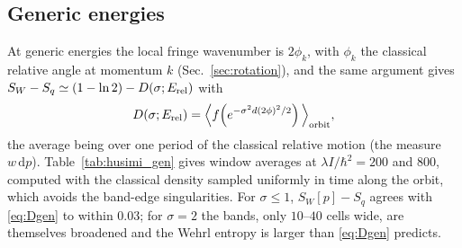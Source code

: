 \documentclass[preprint,12pt]{elsarticle}
\newcommand{\dd}{\mathrm{d}}
\newcommand{\Erel}{E_{\rm rel}}
\newcommand{\SW}{S_{W}}
\begin{document}
\subsection{Generic energies}

At generic energies the local fringe wavenumber is $2\phi_{k}$, with $\phi_{k}$
the classical relative angle at momentum $k$ (Sec.~\ref{sec:rotation}), and the
same argument gives $\SW-S_{q}\simeq(1-\ln2)-D(\sigma;\Erel)$ with
\begin{equation}
D(\sigma;\Erel)=\Big\langle f\!\left(e^{-\sigma^{2}d(2\phi)^{2}/2}\right)
\Big\rangle_{\rm orbit},
\label{eq:Dgen}
\end{equation}
the average being over one period of the classical relative motion (the
measure $w\,\dd p$). Table~\ref{tab:husimi_gen} gives window averages at
$\lambda I/\hbar^{2}=200$ and $800$, computed with the classical density sampled
uniformly in time along the orbit, which avoids the band-edge singularities.
For $\sigma\le1$, $\SW[p]-S_{q}$ agrees with \eqref{eq:Dgen} to within
$0.03$; for $\sigma=2$ the bands, only $10$--$40$ cells wide, are themselves
broadened and the Wehrl entropy is larger than \eqref{eq:Dgen} predicts.
\end{document}
